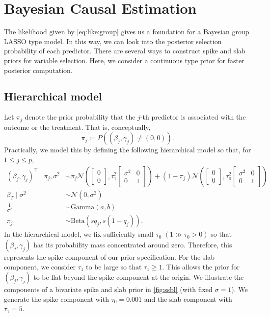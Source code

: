 \documentclass[preprint,12pt]{elsarticle}
\newcommand{\normal}{\mathcal{N}}
\begin{document}
\section{Bayesian Causal Estimation}\label{sec:bayes}

The likelihood given by \cref{eq:like:group} gives us
a foundation for a Bayesian group LASSO 
\citep{xu2015} type model. In this way, we can look into the posterior selection
probability of each predictor. There are several
ways to construct spike and slab priors for
variable selection. Here, we consider a continuous type
prior \citep{ishwaran2005} for faster posterior
computation.


\subsection{Hierarchical model}

Let $\pi_j$ denote the prior probability that the $j$-th
predictor is associated with the outcome or the 
treatment. That is, conceptually,
\begin{equation}
	\pi_j \coloneqq P\left((\beta_j,\gamma_j)\not=(0,0)\right).
\end{equation}
Practically, we model this by defining the following hierarchical model
so that,
for $1\le j\le p$,
\begin{align}
	\label{eq:spike:slab:prior:beta:gamma}(\beta_j,\gamma_j)^{\top} \mid \pi_{j}, \sigma^2 &\sim 
	\pi_{j}\normal\left( \begin{bmatrix}
		0 \\
		0
	\end{bmatrix}, 
	\tau_1^2\begin{bmatrix}
		\sigma^2 & 0 \\
		0 & 1
	\end{bmatrix}\right)
	+ (1-\pi_{j}) \normal\left(\begin{bmatrix}
		0 \\
		0
	\end{bmatrix}, 
	\tau_0^2\begin{bmatrix}
		\sigma^2 & 0 \\
		0 & 1
	\end{bmatrix}\right)\\
	\beta_T\mid \sigma^2 &\sim \normal\left(0, \sigma^2\right)\label{eq:prior:causal}\\
        \frac{1}{\sigma^2}&\sim \text{Gamma}(a, b)\\
	\pi_{j} &\sim\text{Beta}\left(sq_j, s(1-q_j)\right).
\end{align}
In the hierarchical model, we fix sufficiently small $\tau_0$
$(1\gg\tau_0>0)$ so that  $(\beta_j, \gamma_j)$ has its probability mass 
concentrated around zero. Therefore, this represents the spike component of our prior specification. 
For the slab component, we consider $\tau_1$ to be large so that $\tau_1\ge 1$. This allows the prior for $(\beta_j,\gamma_j)$ to be flat beyond the spike component at the origin. 
We illustrate the components of a bivariate spike and slab prior in 
\cref{fig:ssbl} (with fixed $\sigma=1$). We generate the spike component 
with $\tau_0=0.001$ and the slab component with $\tau_1=5$.
\end{document}
